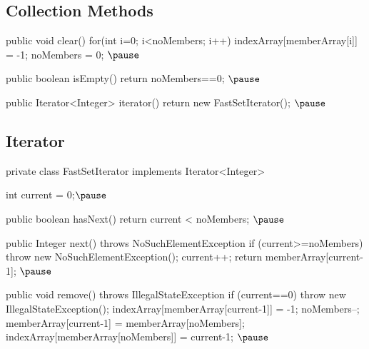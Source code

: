 
\begin{slide}
\section{Collection Methods}

\begin{java}
   public void clear() {
      for(int i=0; i<noMembers; i++) {
         indexArray[memberArray[i]] = -1;
      }
      noMembers = 0;
   }$\pause$

   public boolean isEmpty() {
      return noMembers==0;
   }$\pause$
  
   public Iterator<Integer> iterator() {
      return new FastSetIterator();
   }$\pause$
\end{java}
\end{slide}


\begin{slide}
\section[-2]{Iterator}

\begin{java}
   private class FastSetIterator implements Iterator<Integer> {
      int current = 0;$\pause$
      
      public boolean hasNext() {
         return current < noMembers;
      }$\pause$
      
      public Integer next() throws NoSuchElementException {
         if (current>=noMembers) throw new NoSuchElementException();
         current++;
         return memberArray[current-1];
      }$\pause$
      
      public void remove() throws IllegalStateException {
         if (current==0) throw new IllegalStateException();
         indexArray[memberArray[current-1]] = -1;
         noMembers--;
         memberArray[current-1] = memberArray[noMembers];
	 indexArray[memberArray[noMembers]] = current-1;
      }$\pause$
   }
\end{java}
\end{slide}


